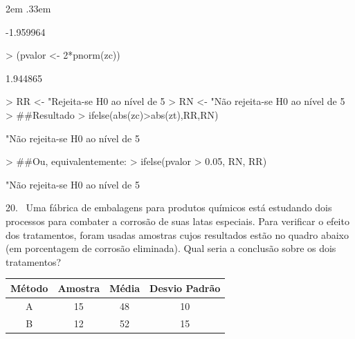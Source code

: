 \documentclass{article}
\newenvironment{ManualExercise}
  {\begin{list}{}{\leftmargin \QuestionIndent
    \partopsep0pt \parsep\parskip \topsep\QuestionBefore
    \itemsep\QuestionBefore \labelwidth2em
    \labelsep.33em
    \usecounter{Question}}}
  {\end{list}}
\begin{document}
\begin{Exercise}
\begin{ManualExercise}
\begin{Schunk}
\begin{Soutput}
[1] -1.959964
\end{Soutput}
\begin{Sinput}
> (pvalor <- 2*pnorm(zc))
\end{Sinput}
\begin{Soutput}
[1] 1.944865
\end{Soutput}
\begin{Sinput}
> RR <- "Rejeita-se H0 ao nível de 5%
> RN <- "Não rejeita-se H0 ao nível de 5%
> ##Resultado
> ifelse(abs(zc)>abs(zt),RR,RN)
\end{Sinput}
\begin{Soutput}
[1] "Não rejeita-se H0 ao nível de 5%
\end{Soutput}
\begin{Sinput}
> ##Ou, equivalentemente:
> ifelse(pvalor > 0.05, RN, RR)
\end{Sinput}
\begin{Soutput}
[1] "Não rejeita-se H0 ao nível de 5%
\end{Soutput}
\end{Schunk}

\item[20.~]Uma fábrica de embalagens para produtos químicos está estudando dois processos para combater a corrosão de suas latas especiais. Para verificar o efeito dos tratamentos, foram usadas amostras cujos resultados estão no quadro abaixo (em porcentagem de corrosão eliminada). Qual seria a conclusão sobre os dois tratamentos?

\begin{tabular}{cccc}\\ \hline
Método & Amostra & Média & Desvio Padrão \\ \hline
A & 15 & 48 & 10 \\
B & 12 & 52 & 15 \\ \hline
\end{tabular}


\end{ManualExercise}
\end{Exercise}
\end{document}
